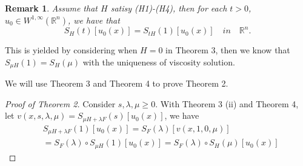 \documentclass[preprint]{elsarticle}
\newtheorem{remark}{Remark}[section]
\numberwithin{equation}{section}
\begin{document}
\begin{remark}
    Assume that $H$ satisy (H1)-(H4), then for each $t >0$, $u_0 \in W^{1,\infty}(\mathbb R^n)$, we have that
    \begin{equation}
        S_H(t)[u_0(x)]=S_{tH}(1)[u_0(x)] \quad in \quad \mathbb R^n.
    \end{equation}
\end{remark}
This is yielded by considering when $H=0$ in Theorem 3, then we know that $S_{\mu H}(1)=S_H(\mu)$ with the uniqueness of viscosity solution.

We will use Theorem 3 and Theorem 4 to prove Theorem 2. 
\begin{proof}[Proof of Theorem 2]
    Consider $s,\lambda,\mu \geq 0$.
    With Theorem 3 (ii) and Theorem 4, let $v(x,s,\lambda,\mu)=S_{\mu H+\lambda F}(s)[u_0(x)]$, we have
    \begin{align*}
        & S_{\mu H+\lambda F}(1)[u_0(x)]= S_F(\lambda)[v(x,1,0,\mu)]\\
        &= S_F(\lambda) \circ S_{\mu H} (1)[u_0(x)]= S_F(\lambda) \circ S_H(\mu) [u_0(x)]
    \end{align*}
\end{proof}
\end{document}
